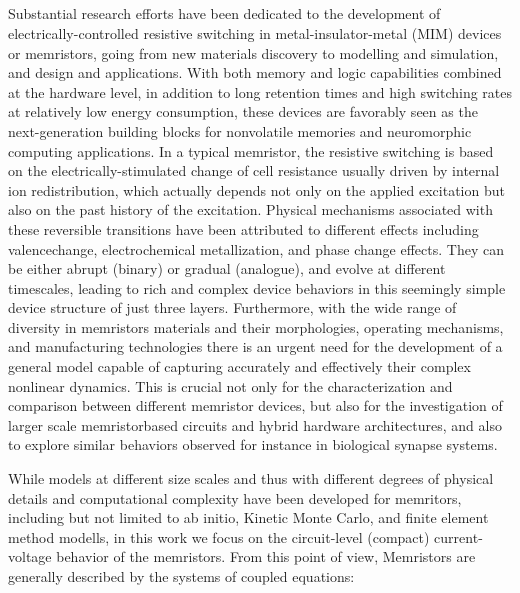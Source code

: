 \documentclass[10pt]{article}
\begin{document}
    \begin{multicols}{2}
    {\centering %
    \section{}}
        Substantial research efforts have been dedicated to the development of electrically-controlled resistive switching in metal-insulator-metal (MIM) devices or memristors, going from new materials discovery to modelling and simulation, and design and applications. With both memory and logic capabilities combined at the hardware level, in addition to long retention times and high switching rates at relatively low energy consumption, these devices are favorably seen as the next-generation building blocks for nonvolatile memories and neuromorphic computing applications. In a typical memristor, the resistive switching is based on the electrically-stimulated change of cell resistance usually driven by internal ion redistribution, which actually depends not only on the applied excitation but also on the past history of the excitation. Physical mechanisms associated with these reversible transitions have been attributed to different effects including valencechange, electrochemical metallization, and phase change effects. They can be either abrupt (binary) or gradual (analogue), and evolve at different timescales, leading to rich and complex device behaviors in this seemingly simple device structure of just three layers. Furthermore, with the wide range of diversity in memristors materials and their morphologies, operating mechanisms, and manufacturing technologies there is an urgent need for the development of a general model capable of capturing accurately and effectively their complex nonlinear dynamics. This is crucial not only for the characterization and comparison between different memristor devices, but also for the investigation of larger scale memristorbased circuits and hybrid hardware architectures, and also to explore similar behaviors observed for instance in biological synapse systems.
        \par
        While models at different size scales and thus with different degrees of physical details and computational complexity have been developed for memritors, including but not limited to ab initio, Kinetic Monte Carlo, and finite element method modells, in this work we focus on the circuit-level (compact) current-voltage behavior of the memristors. From this point of view, Memristors are generally described by the systems of coupled equations:

\end{multicols}
\end{document}
